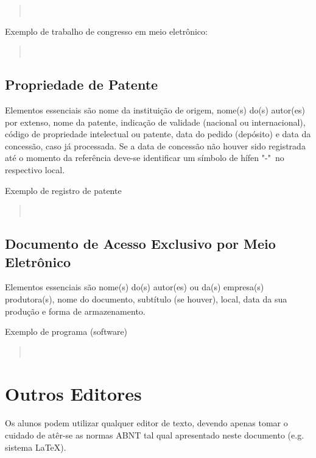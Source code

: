 \documentclass[repeatfields,xlists,xpacks,oneside,yearsonly]{ufrgscca}
\begin{document}
\begin{appendix}
\begin{quote}\noindent{}\\\end{quote}


Exemplo de trabalho de congresso em meio eletrônico:\\

\begin{quote}\noindent{}\\\end{quote}


\section{Propriedade de Patente}

Elementos essenciais são nome da instituição de origem, nome(s) do(s)
autor(es) por extenso, nome da patente, indicação de validade (nacional ou
internacional), código de propriedade intelectual ou patente, data do pedido
(depósito) e data da concessão, caso já processada. Se a data de concessão
não houver sido registrada até o momento da referência deve-se identificar
um símbolo de hífen "-"\ no respectivo local.

Exemplo de registro de patente \\

\begin{quote}\noindent{}\\\end{quote}


\section{Documento de Acesso Exclusivo por Meio Eletrônico}

Elementos essenciais são nome(s) do(s) autor(es) ou da(s) empresa(s)
produtora(s), nome do documento, subtítulo (se houver), local, data da sua
produção e forma de armazenamento.

Exemplo de programa (software)\\

\begin{quote}\noindent{}\\\end{quote}



\chapter{Outros Editores}

Os alunos podem utilizar qualquer editor de texto, devendo apenas tomar o cuidado de atêr-se as normas ABNT tal qual apresentado neste documento (e.g. sistema \LaTeX).

\end{appendix}
\end{document}
